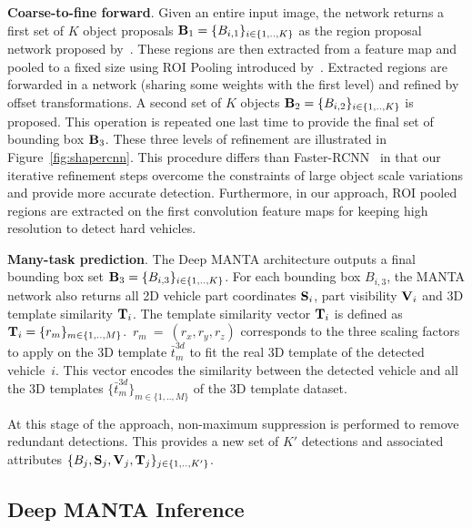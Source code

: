 \documentclass[10pt,twocolumn,letterpaper]{article}
\begin{document}
\textbf{Coarse-to-fine forward}. Given an entire input image, the network returns a first set of $K$ object proposals $\bold{B}_1 = \{B_{i,1}\}_{i \in \{1, .., K\}}$ as the region proposal network proposed by~\cite{faster}. These regions are then extracted from a feature map and pooled to a fixed size using ROI Pooling introduced by~\cite{fast}. Extracted regions are forwarded in a network (sharing some weights with the first level) and refined by offset transformations. A second set of $K$ objects $\bold{B}_2 = \{B_{i,2}\}_{i \in \{1, .., K\}}$ is proposed. This operation is repeated one last time to provide the final set of bounding box $\bold{B}_3$. These three levels of refinement are illustrated in Figure~\ref{fig:shapercnn}. This procedure differs than Faster-RCNN~\cite{faster} in that our iterative refinement steps overcome the constraints of large object scale variations and provide more accurate detection. Furthermore, in our approach, ROI pooled regions are extracted on the first convolution feature maps for keeping high resolution to detect hard vehicles.

\textbf{Many-task prediction}. The Deep MANTA architecture outputs a final bounding box set $\bold{B}_3 = \{B_{i,3}\}_{i \in \{1, .., K\}}$. For each bounding box $B_{i,3}$, the MANTA network also returns all 2D vehicle part coordinates $\bold{S}_i$, part visibility $\bold{V}_i$ and 3D template similarity $\bold{T}_i$. The template similarity vector $\bold{T}_i$ is defined as $\bold{T}_i = \{r_m\}_{m \in \{1,.., M\}}$.~$r_m~=~(r_x,r_y,r_z)$ corresponds to the three scaling factors to apply on the 3D template $\bar{t}^{3d}_m$ to fit the real 3D template of the detected vehicle~$i$. This vector encodes the similarity between the detected vehicle and all the 3D templates  $\{\bar{t}^{3d}_m\}_{m \in \{1,..,M\}} $ of the 3D template dataset. 

At this stage of the approach, non-maximum suppression is performed to remove redundant detections. This provides a new set of $K'$ detections and associated attributes $\{B_{j},\bold{S}_j, \bold{V}_j,\bold{T}_j\}_{j \in \{1,..,K'\}}$.

\subsection{Deep MANTA Inference}
\label{Inference}
\end{document}
